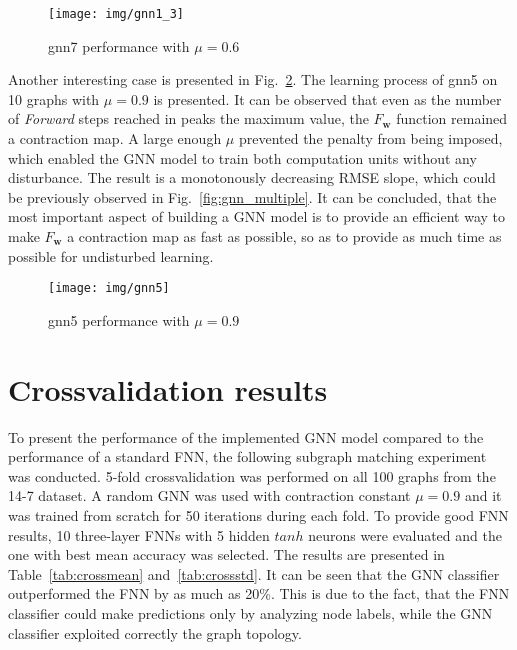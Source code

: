 \begin{figure}[h!]
\begin{center}
	\texttt{[image: img/gnn1\_3]}
	\caption{gnn7 performance with $\mu = 0.6$}
	\label{fig:gnn7_06}
\end{center}
\end{figure}

\newpage
Another interesting case is presented in Fig.~\ref{fig:gnn5_09}. The learning process of gnn5 on 10 graphs with $\mu = 0.9$ is presented. It can be observed that even as the number of \emph{Forward} steps reached in peaks the maximum value, the $F_{\bm{w}}$ function remained a contraction map. A large enough $\mu$ prevented the penalty from being imposed, which enabled the GNN model to train both computation units without any disturbance. The result is a monotonously decreasing RMSE slope, which could be previously observed in Fig.~\ref{fig:gnn_multiple}. It can be concluded, that the most important aspect of building a GNN model is to provide an efficient way to make $F_{\bm{w}}$ a contraction map as fast as possible, so as to provide as much time as possible for undisturbed learning.

\newpage
\begin{figure}[h!]
\begin{center}
	\texttt{[image: img/gnn5]}
	\caption{gnn5 performance with $\mu = 0.9$}
	\label{fig:gnn5_09}
\end{center}
\end{figure}

\newpage
\section{Crossvalidation results}
To present the performance of the implemented GNN model compared to the performance of a standard FNN, the following subgraph matching experiment was conducted. 5-fold crossvalidation was performed on all 100 graphs from the 14-7 dataset. A random GNN was used with contraction constant $\mu = 0.9$ and it was trained from scratch for 50 iterations during each fold. To provide good FNN results, 10 three-layer FNNs with 5 hidden $tanh$ neurons were evaluated and the one with best mean accuracy was selected. The results are presented in Table~\ref{tab:crossmean} and~\ref{tab:crossstd}. It can be seen that the GNN classifier outperformed the FNN by as much as 20\%. This is due to the fact, that the FNN classifier could make predictions only by analyzing node labels, while the GNN classifier exploited correctly the graph topology.

